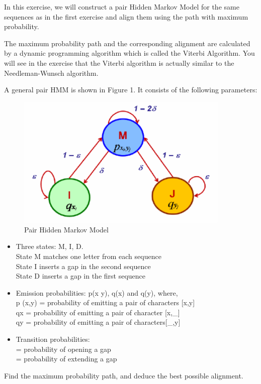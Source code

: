 \documentclass[a4paper,11pt]{article}
\DeclareRobustCommand{\greektext}{%
  \fontencoding{LGR}\selectfont\def\encodingdefault{LGR}}
\DeclareRobustCommand{\textgreek}[1]{\leavevmode{\greektext #1}}
\begin{document}
In this exercise, we will construct a pair Hidden Markov Model for
the same sequences as in the first exercise and align them using the
path with maximum probability.

The maximum probability path and the corresponding alignment are calculated by a dynamic
programming algorithm which is called the Viterbi Algorithm. You will
see in the exercise that the Viterbi algorithm is actually similar
to the Needleman-Wunsch algorithm.

A general pair HMM is shown in Figure 1. It consists of the following parameters:
\begin{figure}
\begin{centering}
\includegraphics[width=4in]{HMMfigures.eps}\caption{Pair Hidden Markov Model}
\par\end{centering}
\end{figure}

\begin{itemize}
\item Three states: M, I, D.\\
State M matches one letter from each sequence\\
State I inserts a gap in the second sequence \\
State D inserts a gap in the first sequence

\item Emission probabilities: p(x y), q(x) and q(y), where,\\
p (x,y) = probability of emitting a pair of characters {[}x,y{]} \\
qx = probability of emitting a pair of character {[}x,\_{]}\\
qy = probability of emitting a pair of characters{[}\_,y{]}

\item Transition probabilities:\\
\textgreek{d} = probability of opening a gap \\
\textgreek{e} = probability of extending a gap \\
\end{itemize}

Find the maximum probability path, and deduce the best possible alignment.
\end{document}
